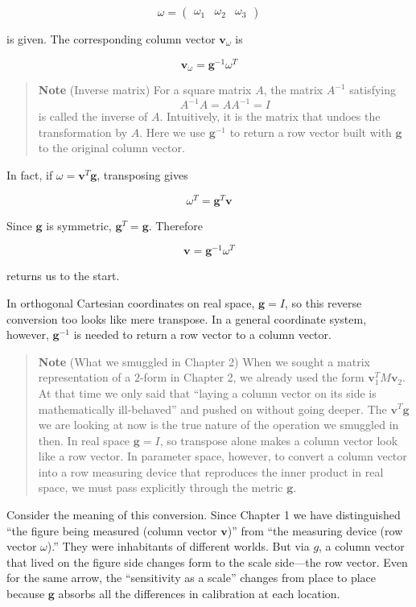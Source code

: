 \documentclass[a4paper,12pt,openany]{book}
\begin{document}
\[
\omega =
\begin{pmatrix}
\omega_1 & \omega_2 & \omega_3
\end{pmatrix}
\]

is given. The corresponding column vector \(\mathbf{v}_\omega\) is

\[
\mathbf{v}_\omega = \mathbf{g}^{-1}\omega^T
\]

\begin{quote}
\textbf{Note} (Inverse matrix) For a square matrix \(A\), the matrix
\(A^{-1}\) satisfying \[
A^{-1}A = AA^{-1} = I
\] is called the inverse of \(A\). Intuitively, it is the matrix that
undoes the transformation by \(A\). Here we use \(\mathbf{g}^{-1}\) to
return a row vector built with \(\mathbf{g}\) to the original column
vector.
\end{quote}

In fact, if \(\omega = \mathbf{v}^T\mathbf{g}\), transposing gives

\[
\omega^T = \mathbf{g}^T\mathbf{v}
\]

Since \(\mathbf{g}\) is symmetric, \(\mathbf{g}^T = \mathbf{g}\).
Therefore

\[
\mathbf{v} = \mathbf{g}^{-1}\omega^T
\]

returns us to the start.

In orthogonal Cartesian coordinates on real space, \(\mathbf{g}=I\), so
this reverse conversion too looks like mere transpose. In a general
coordinate system, however, \(\mathbf{g}^{-1}\) is needed to return a
row vector to a column vector.

\begin{quote}
\textbf{Note} (What we smuggled in Chapter 2) When we sought a matrix
representation of a \(2\)-form in Chapter 2, we already used the form
\(\mathbf{v}_1^T M \mathbf{v}_2\). At that time we only said that
``laying a column vector on its side is mathematically ill-behaved'' and
pushed on without going deeper. The \(\mathbf{v}^T\mathbf{g}\) we are
looking at now is the true nature of the operation we smuggled in then.
In real space \(\mathbf{g}=I\), so transpose alone makes a column vector
look like a row vector. In parameter space, however, to convert a column
vector into a row measuring device that reproduces the inner product in
real space, we must pass explicitly through the metric \(\mathbf{g}\).
\end{quote}

Consider the meaning of this conversion. Since Chapter 1 we have
distinguished ``the figure being measured (column vector
\(\mathbf{v}\))'' from ``the measuring device (row vector \(\omega\)).''
They were inhabitants of different worlds. But via \(g\), a column
vector that lived on the figure side changes form to the scale
side—the row vector. Even for the same arrow, the ``sensitivity as a
scale'' changes from place to place because \(\mathbf{g}\) absorbs all
the differences in calibration at each location.
\end{document}
